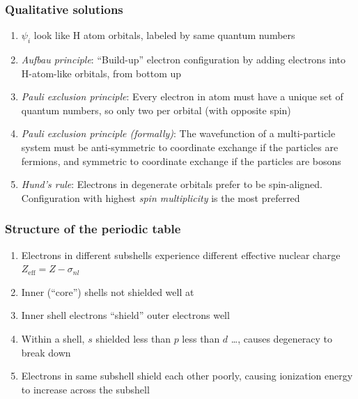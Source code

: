 \documentclass[11pt]{article}
\begin{document}
\subsubsection{Qualitative solutions}
\label{sec:orga918de9}
\begin{enumerate}
\item \(\psi_i\) look like H atom orbitals,  labeled by same quantum numbers
\item \emph{Aufbau principle}: ``Build-up'' electron configuration by adding electrons into H-atom-like orbitals, from bottom up
\item \emph{Pauli exclusion principle}: Every electron in atom must have a unique set of quantum numbers, so only two per orbital (with opposite spin)
\item \emph{Pauli exclusion principle (formally)}: The wavefunction of a multi-particle system must be anti-symmetric to coordinate exchange if the particles are fermions, and symmetric to coordinate exchange if the particles are bosons
\item \emph{Hund's rule}: Electrons in degenerate orbitals prefer to be spin-aligned.  Configuration with highest \emph{spin multiplicity} is the most preferred
\end{enumerate}
\subsubsection{Structure of the periodic table}
\label{sec:orgc3ae9f2}
\begin{enumerate}
\item Electrons in different subshells experience different effective nuclear charge \(Z_\mathrm{eff} = Z - \sigma_{nl}\)
\item Inner (``core'') shells not shielded well at
\item Inner shell electrons ``shield'' outer electrons well
\item Within a shell, \(s\) shielded less than \(p\) less than \(d\) \ldots{}, causes degeneracy to break down
\item Electrons in same subshell shield each other poorly, causing ionization energy to increase across the subshell
\end{enumerate}
\end{document}

